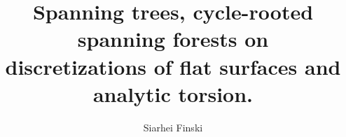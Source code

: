 \documentclass[12pt]{article}
\title{Spanning trees, cycle-rooted spanning forests on\\
discretizations of flat surfaces and analytic torsion.}
\author
{Siarhei Finski
}
\date{}
\numberwithin{equation}{section}
\theoremstyle{theorem}
\theoremstyle{definition}
\theoremstyle{remark}
\newenvironment{sciabstract}{}
\begin{document}
 

\maketitle 


\begin{sciabstract}
  \textbf{Abstract.}
  We study the asymptotic expansion of the determinant of the graph Laplacian associated to discretizations of a half-translation surface endowed with a flat unitary vector bundle. By doing so, over the discretizations, we relate the asymptotic expansion of the number of spanning trees and the sum of cycle-rooted spanning forests weighted by the monodromy of the connection of the unitary vector bundle, to the corresponding zeta-regularized determinants.
  \par As one application, by combining our result with a recent work of Kassel-Kenyon, modulo some universal topological constants, we give an explicit formula for the limit of the probability that a cycle-rooted spanning forest with non-contractible loops, sampled uniformly on discretizations approaching a given surface, induces the given lamination by its cycles.
  We also calculate an explicit value for the limit of certain topological observables on the associated loop measures.
\end{sciabstract}


\tableofcontents
\end{document}

